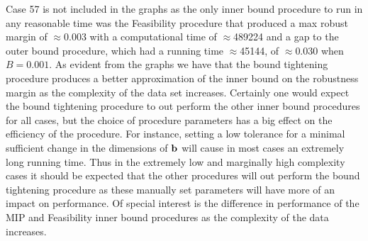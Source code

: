 Case 57 is not included in the graphs as the only inner bound procedure to run in any reasonable time was the Feasibility procedure that produced a max robust margin of $\approx$0.003 with a computational time of $\approx$489224 and a gap to the outer bound procedure, which had a running time $\approx$45144, of $\approx 0.030$ when $B=0.001$.
As evident from the graphs we have that the bound tightening procedure produces a better approximation of the inner bound on the robustness margin as the complexity of the data set increases. 
Certainly one would expect the bound tightening procedure to out perform the other inner bound procedures for all cases, but the choice of procedure parameters has a big effect on the efficiency of the procedure. 
For instance, setting a low tolerance for a minimal sufficient change in the dimensions of $\mathbf{b}$ will cause in most cases an extremely long running time. 
Thus in the extremely low and marginally high complexity cases it should be expected that the other procedures will out perform the bound tightening procedure as these manually set parameters will have more of an impact on performance. 
Of special interest is the difference in performance of the MIP and Feasibility inner bound procedures as the complexity of the data increases. 






